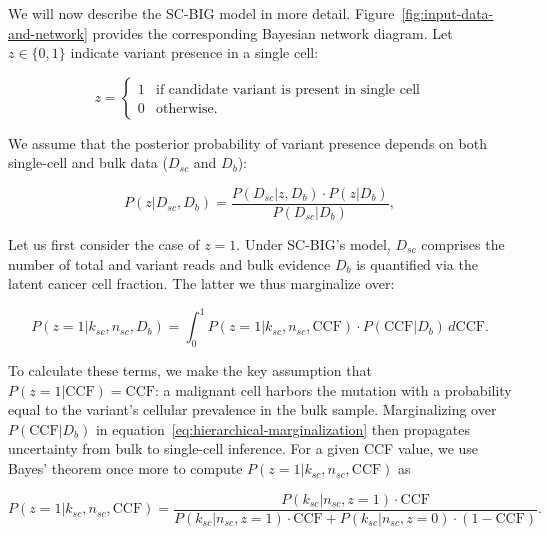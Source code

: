 \documentclass[10pt]{article}
\begin{document}
We will now describe the SC-BIG model in more detail.
Figure~\ref{fig:input-data-and-network} provides the corresponding Bayesian network diagram. Let $z \in \{0, 1\}$ indicate variant presence in a single cell:

\begin{equation}
    z =
    \begin{cases}
        1 & \text{if candidate variant is present in single cell} \\
        0 & \text{otherwise}.
    \end{cases}
\end{equation}

We assume that the posterior probability of variant presence depends on both single-cell and bulk data ($D_{sc}$ and $D_{b}$):

\begin{equation}
    P(z | D_{sc}, D_{b}) = \frac{
        P(D_{sc} | z, D_{b}) \cdot P(z | D_{b})
    }{
        P(D_{sc} | D_{b})
    }
    ,
\label{eq:base-model-1}
\end{equation}

Let us first consider the case of $z = 1$.
Under SC-BIG's model, $D_{sc}$ comprises the number of total and variant reads and bulk evidence $D_{b}$ is quantified via the latent cancer cell fraction.
The latter we thus marginalize over:

\begin{equation}
    P(z=1 | k_{sc}, n_{sc}, D_{b}) = \int_{0}^{1} P(z=1 | k_{sc}, n_{sc}, \text{CCF}) \cdot P(\text{CCF} | D_b)\,d\text{CCF}
    .
\label{eq:hierarchical-marginalization}
\end{equation}

To calculate these terms, we make the key assumption that $P(z=1 | \text{CCF}) = \text{CCF}$: a malignant cell harbors the mutation with a probability equal to the variant's cellular prevalence in the bulk sample.
Marginalizing over $P(\text{CCF} | D_b)$ in equation~\eqref{eq:hierarchical-marginalization} then propagates uncertainty from bulk to single-cell inference.
For a given CCF value, we use Bayes' theorem once more to compute $P(z=1 | k_{sc}, n_{sc}, \text{CCF})$ as

\begin{equation}
    P(z=1 | k_{sc}, n_{sc}, \text{CCF}) = \frac{
        P(k_{sc} | n_{sc}, z=1) \cdot \text{CCF}
    }{
        P(k_{sc} | n_{sc}, z=1) \cdot \text{CCF} + P(k_{sc} | n_{sc}, z=0) \cdot (1-\text{CCF})
    }
    .
\label{eq:posterior-given-ccf}
\end{equation}
\end{document}
